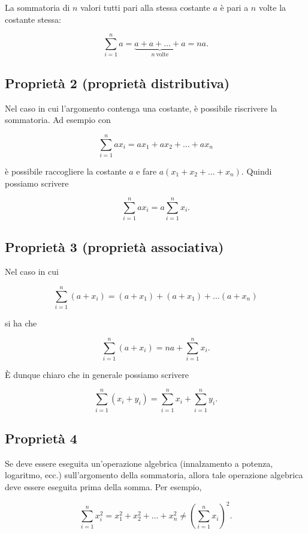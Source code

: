 \documentclass[
  11pt,
]{krantz}
\theoremstyle{definition}
\theoremstyle{definition}
\theoremstyle{definition}
\theoremstyle{definition}
\theoremstyle{remark}
\begin{document}
La sommatoria di \(n\) valori tutti pari alla stessa costante \(a\) è pari a \(n\) volte la costante stessa:

\[
  \sum_{i=1}^{n} a =  \underbrace{a + a + \dots + a}_{n~\text{volte}} = n a.
  \]

\hypertarget{proprietuxe0-2-proprietuxe0-distributiva}{%
\subsection{Proprietà 2 (proprietà distributiva)}\label{proprietuxe0-2-proprietuxe0-distributiva}}

Nel caso in cui l'argomento contenga una costante, è possibile riscrivere la sommatoria. Ad esempio con

\[
  \sum_{i=1}^{n} a x_i =  a x_1 + a x_2 + \dots + a x_n
  \]

è possibile raccogliere la costante \(a\) e fare \(a(x_1 +x_2 + \dots + x_n)\). Quindi possiamo scrivere

\[
  \sum_{i=1}^{n} a x_i =  a  \sum_{i=1}^{n} x_i.
  \]

\hypertarget{proprietuxe0-3-proprietuxe0-associativa}{%
\subsection{Proprietà 3 (proprietà associativa)}\label{proprietuxe0-3-proprietuxe0-associativa}}

Nel caso in cui

\[
  \sum_{i=1}^{n} (a + x_i) =  (a + x_1) +  (a + x_1) + \dots  (a + x_n)
  \]

si ha che

\[
  \sum_{i=1}^{n} (a + x_i) =  n a + \sum_{i=1}^{n} x_i.
  \]

È dunque chiaro che in generale possiamo scrivere

\[
  \sum_{i=1}^{n} (x_i + y_i) =  \sum_{i=1}^{n} x_i + \sum_{i=1}^{n} y_i.
  \]

\hypertarget{proprietuxe0-4}{%
\subsection{Proprietà 4}\label{proprietuxe0-4}}

Se deve essere eseguita un'operazione algebrica (innalzamento a potenza, logaritmo, ecc.) sull'argomento della sommatoria, allora tale operazione algebrica deve essere eseguita prima della somma. Per esempio,

\[
\sum_{i=1}^{n} x_i^2 = x_1^2 + x_2^2 + \dots + x_n^2 \neq \left(\sum_{i=1}^{n} x_i \right)^2.
\]
\end{document}
